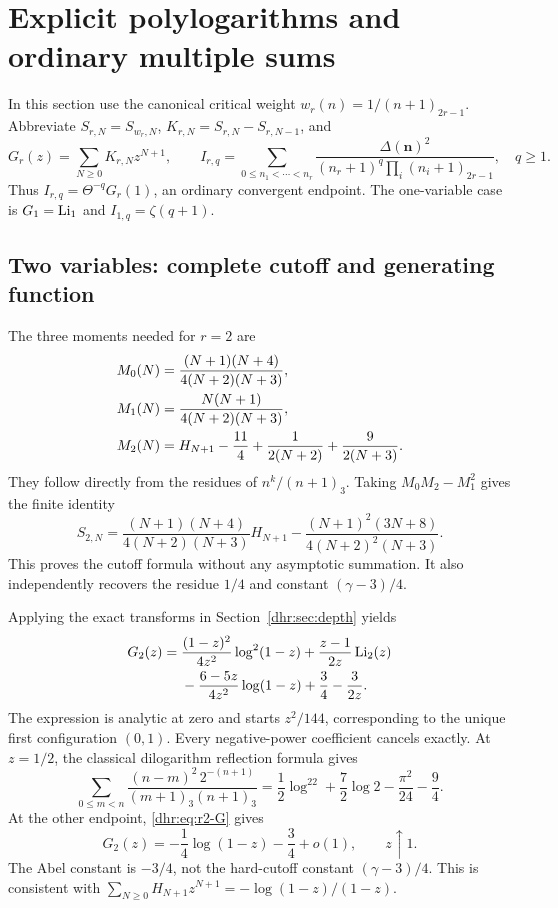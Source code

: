 \section{Explicit polylogarithms and ordinary multiple sums}
\label{dhr:sec:explicit}

In this section use the canonical critical weight
$w_r(n)=1/(n+1)_{2r-1}$. Abbreviate $S_{r,N}=S_{w_r,N}$,
$K_{r,N}=S_{r,N}-S_{r,N-1}$, and
\begin{equation}\label{dhr:eq:canonical-GI}
 G_r(z)=\sum_{N\geq0}K_{r,N}z^{N+1},\qquad
 I_{r,q}=\sum_{0\leq n_1<\cdots<n_r}
 \frac{\Delta(\bm n)^2}
 {(n_r+1)^q\prod_i(n_i+1)_{2r-1}},\quad q\geq1.
\end{equation}
Thus $I_{r,q}=\Theta^{-q}G_r(1)$, an ordinary convergent endpoint.
The one-variable case is $G_1=\operatorname{Li}_1$ and $I_{1,q}=\zeta(q+1)$.

\subsection{Two variables: complete cutoff and generating function}
The three moments needed for $r=2$ are
\begin{align}
 M_0(N)&=\frac{(N+1)(N+4)}{4(N+2)(N+3)},\notag\\
 M_1(N)&=\frac{N(N+1)}{4(N+2)(N+3)},\notag\\
 M_2(N)&=H_{N+1}-\frac{11}{4}
                      +\frac1{2(N+2)}+\frac9{2(N+3)}.
 \label{dhr:eq:r2-moments}
\end{align}
They follow directly from the residues of $n^k/(n+1)_3$.
Taking $M_0M_2-M_1^2$ gives the finite identity
\begin{equation}\label{dhr:eq:r2-cutoff}
 \boxed{S_{2,N}=
 \frac{(N+1)(N+4)}{4(N+2)(N+3)}H_{N+1}
 -\frac{(N+1)^2(3N+8)}{4(N+2)^2(N+3)}.}
\end{equation}
This proves the cutoff formula without any asymptotic summation.
It also independently recovers the residue $1/4$ and constant
$(\gamma-3)/4$.

Applying the exact transforms in Section~\ref{dhr:sec:depth} yields
\begin{align}
 G_2(z)={}&\frac{(1-z)^2}{4z^2}\log^2(1-z)
        +\frac{z-1}{2z}\operatorname{Li}_2(z)\notag\\
 &-\frac{6-5z}{4z^2}\log(1-z)+\frac34-\frac3{2z}.
 \label{dhr:eq:r2-G}
\end{align}
The expression is analytic at zero and starts $z^2/144$,
corresponding to the unique first configuration $(0,1)$.
Every negative-power coefficient cancels exactly.
At $z=1/2$, the classical dilogarithm reflection formula
\cite{dlmf:polylog} gives
\begin{equation}\label{dhr:eq:G-half}
 \sum_{0\leq m<n}\frac{(n-m)^2\,2^{-(n+1)}}{(m+1)_3(n+1)_3}
 =\frac12\log^22+\frac72\log2-\frac{\pi^2}{24}-\frac94.
\end{equation}
At the other endpoint, \eqref{dhr:eq:r2-G} gives
\begin{equation}\label{dhr:eq:Abel-constant}
 G_2(z)=-\frac14\log(1-z)-\frac34+o(1),\qquad z\uparrow1.
\end{equation}
The Abel constant is $-3/4$, not the hard-cutoff constant
$(\gamma-3)/4$. This is consistent with
$\sum_{N\geq0}H_{N+1}z^{N+1}=-\log(1-z)/(1-z)$.


